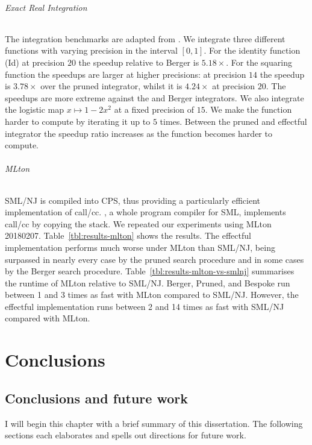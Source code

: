 \documentclass[12pt,phd,lfcs,twoside,openright,logo,leftchapter,normalheadings]{infthesis}
\theoremstyle{plain}
\theoremstyle{definition}
\begin{document}
\paragraph{Exact Real Integration}
The integration benchmarks are adapted from \citet{Simpson98}. We
integrate three different functions with varying precision in the
interval $[0,1]$. For the identity function (Id) at precision $20$ the
speedup relative to Berger is $5.18\times$. For the squaring function
the speedups are larger at higher precisions: at precision $14$ the
speedup is $3.78\times$ over the pruned integrator, whilst it is
$4.24\times$ at precision $20$. The speedups are more extreme against
the \naive and Berger integrators. We also integrate the logistic map
$x \mapsto 1 - 2x^2$ at a fixed precision of $15$. We make the
function harder to compute by iterating it up to $5$ times. Between
the pruned and effectful integrator the speedup ratio increases as the
function becomes harder to compute.

\paragraph{MLton}
SML/NJ is compiled into CPS, thus providing a particularly efficient
implementation of call/cc.
%
\citet{mlton}, a whole program compiler for SML, implements
call/cc by copying the stack.
%
We repeated our experiments using MLton 20180207.
%
Table~\ref{tbl:results-mlton} shows the results. The effectful
implementation performs much worse under MLton than SML/NJ, being
surpassed in nearly every case by the pruned search procedure and in
some cases by the Berger search procedure.
%
Table~\ref{tbl:results-mlton-vs-smlnj} summarises the runtime of MLton
relative to SML/NJ. Berger, Pruned, and Bespoke run between 1 and 3
times as fast with MLton compared to SML/NJ.
%
However, the effectful implementation runs between 2 and 14 times as
fast with SML/NJ compared with MLton.

\tablethree

\part{Conclusions}
\label{p:conclusions}

\chapter{Conclusions and future work}
\label{ch:conclusions}
%
I will begin this chapter with a brief summary of this
dissertation. The following sections each elaborates and spells out
directions for future work.
\end{document}
